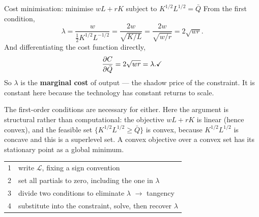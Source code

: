 \begin{worked}{Cost minimisation: minimise $wL+rK$ subject to $K^{1/2}L^{1/2}=\bar Q$}
From the first condition,
\[
  \lambda=\frac{w}{\tfrac12K^{1/2}L^{-1/2}}
  =\frac{2w}{\sqrt{K/L}}
  =\frac{2w}{\sqrt{w/r}}
  =2\sqrt{wr} .
\]
And differentiating the cost function directly,
\[
  \frac{\partial C}{\partial \bar Q}=2\sqrt{wr}=\lambda . \checkmark
\]
So $\lambda$ is the \textbf{marginal cost} of output --- the shadow price of
the constraint. It is constant here because the technology has constant
returns to scale.

The first-order conditions are necessary for either. Here the argument is
structural rather than computational: the objective $wL+rK$ is linear (hence
convex), and the feasible set $\{K^{1/2}L^{1/2}\ge\bar Q\}$ is convex,
because $K^{1/2}L^{1/2}$ is concave and this is a superlevel set. A convex
objective over a convex set has its stationary point as a global minimum.

\begin{center}\footnotesize
\begin{tabular}{ll}
  \hline
  1 & write $\mathcal L$, fixing a sign convention\\
  2 & set all partials to zero, including the one in $\lambda$\\
  3 & divide two conditions to eliminate $\lambda$ $\to$ tangency\\
  4 & substitute into the constraint, solve, then recover $\lambda$\\
  \hline
\end{tabular}
\end{center}
\end{worked}

